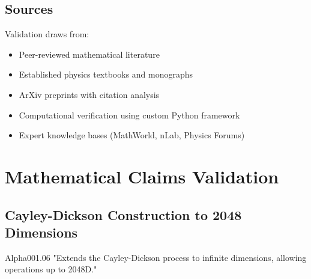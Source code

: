 \subsection{Sources}

Validation draws from:
\begin{itemize}
    \item Peer-reviewed mathematical literature
    \item Established physics textbooks and monographs
    \item ArXiv preprints with citation analysis
    \item Computational verification using custom Python framework
    \item Expert knowledge bases (MathWorld, nLab, Physics Forums)
\end{itemize}

\section{Mathematical Claims Validation}

\subsection{Cayley-Dickson Construction to 2048 Dimensions}

\begin{frameworkclaim}{Alpha001.06}
"Extends the Cayley-Dickson process to infinite dimensions, allowing operations up to 2048D."
\end{frameworkclaim}


